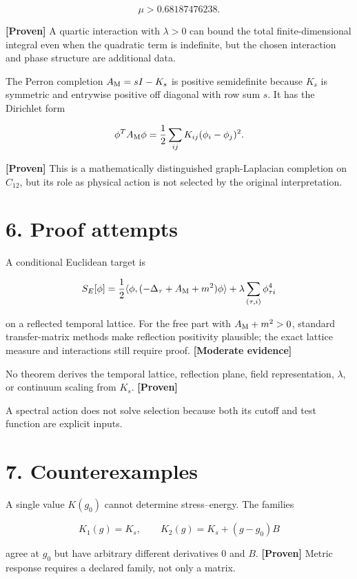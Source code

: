 \documentclass[11pt,a4paper,openany]{report}
\newcommand{\statusProven}{\textcolor{fingreen}{[Proven]}}
\newcommand{\statusModerate}{\textcolor{finviolet}{[Moderate evidence]}}
\begin{document}
\[
\mu>0.68187476238.
\]

\textbf{\statusProven{}} A quartic interaction with \(\lambda>0\) can bound the total finite-dimensional integral even when the quadratic term is indefinite, but the chosen interaction and phase structure are additional data.

The Perron completion \(A_{\rm M}=sI-K_s\) is positive semidefinite because \(K_s\) is symmetric and entrywise positive off diagonal with row sum \(s\). It has the Dirichlet form

\[
\phi^TA_{\rm M}\phi
=\frac12\sum_{ij}K_{ij}(\phi_i-\phi_j)^2.
\]

\textbf{\statusProven{}} This is a mathematically distinguished graph-Laplacian completion on \(C_{12}\), but its role as physical action is not selected by the original interpretation.

\section{6. Proof attempts}

A conditional Euclidean target is

\[
S_E[\phi]
=\frac12\langle\phi,(-\Delta_\tau+A_{\rm M}+m^2)\phi\rangle
+\lambda\sum_{(\tau,i)}\phi_{\tau i}^4
\]

on a reflected temporal lattice. For the free part with \(A_{\rm M}+m^2>0\), standard transfer-matrix methods make reflection positivity plausible; the exact lattice measure and interactions still require proof. \textbf{\statusModerate{}}

No theorem derives the temporal lattice, reflection plane, field representation, \(\lambda\), or continuum scaling from \(K_s\). \textbf{\statusProven{}}

A spectral action does not solve selection because both its cutoff and test function are explicit inputs.

\section{7. Counterexamples}

A single value \(K(g_0)\) cannot determine stress–energy. The families

\[
K_1(g)=K_s,\qquad K_2(g)=K_s+(g-g_0)B
\]

agree at \(g_0\) but have arbitrary different derivatives \(0\) and \(B\). \textbf{\statusProven{}} Metric response requires a declared family, not only a matrix.
\end{document}
